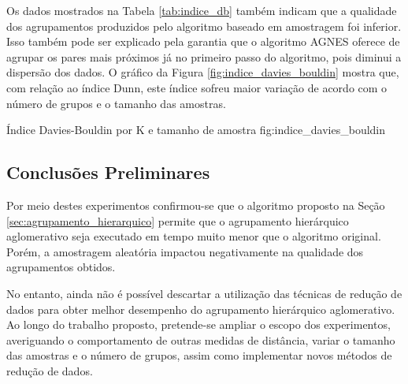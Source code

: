 

Os dados mostrados na Tabela \ref{tab:indice_db} também indicam que a qualidade
dos agrupamentos produzidos pelo algoritmo baseado em amostragem foi inferior.
Isso também pode ser explicado pela garantia que o algoritmo AGNES oferece 
de agrupar os pares mais próximos já no primeiro passo do algoritmo, pois diminui a dispersão dos dados. O gráfico da Figura
\ref{fig:indice_davies_bouldin} mostra que, com relação ao índice Dunn, este
índice sofreu maior variação de acordo com o número de grupos e o tamanho das
amostras. 

{Índice Davies-Bouldin por K e tamanho de amostra}
{fig:indice_davies_bouldin}

\subsection{Conclusões Preliminares}
	\label{subsec:conclusoes_preliminares}
	
Por meio destes experimentos confirmou-se que o algoritmo proposto na Seção \ref{sec:agrupamento_hierarquico} permite que o agrupamento hierárquico
aglomerativo seja executado em tempo muito menor que o algoritmo original.
Porém, a amostragem aleatória impactou negativamente na qualidade dos
agrupamentos obtidos.

No entanto, ainda não é possível descartar a utilização das técnicas de redução
de dados para obter melhor desempenho do agrupamento hierárquico aglomerativo.
Ao longo do trabalho proposto, pretende-se ampliar o escopo dos experimentos,
averiguando o comportamento de outras medidas de distância, variar o tamanho
das amostras e o número de grupos, assim como implementar novos métodos de 
redução de dados.
